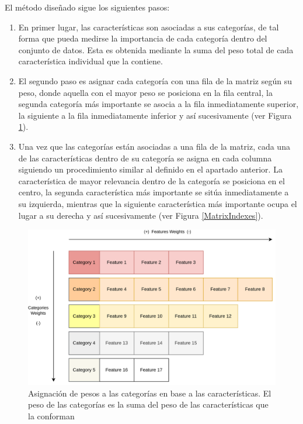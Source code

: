 El método diseñado sigue los siguientes pasos:
\begin{enumerate}
	\item En primer lugar, las características son asociadas a sus categorías, de tal forma que pueda medirse la importancia de cada categoría dentro del conjunto de datos. Esta es obtenida mediante la suma del peso total de cada característica individual que la contiene.
	\item El segundo paso es asignar cada categoría con una fila de la matriz según su peso, donde aquella con el mayor peso se posiciona en la fila central, la segunda categoría más importante se asocia a la fila inmediatamente superior, la siguiente a la fila inmediatamente inferior y así sucesivamente (ver Figura \ref{CategoriesFeaturesWeights}).
	\item Una vez que las categorías están asociadas a una fila de la matriz, cada una de las características dentro de su categoría se asigna en cada columna siguiendo un procedimiento similar al definido en el apartado anterior. La característica de mayor relevancia dentro de la categoría se posiciona en el centro, la segunda característica más importante se sitúa inmediatamente a su izquierda, mientras que la siguiente característica más importante ocupa el lugar a su derecha y así sucesivamente (ver Figura \ref{MatrixIndexes}).
\end{enumerate}


\begin{figure}[H]
	\centering
	\includegraphics[width=12cm]{Figures/indexing_positions_1_2.png}
	\caption[Asignación de pesos a las categorías en base a las características]{Asignación de pesos a las categorías en base a las características. El peso de las categorías es la suma del peso de las características que la conforman}
	\label{CategoriesFeaturesWeights}
\end{figure}


